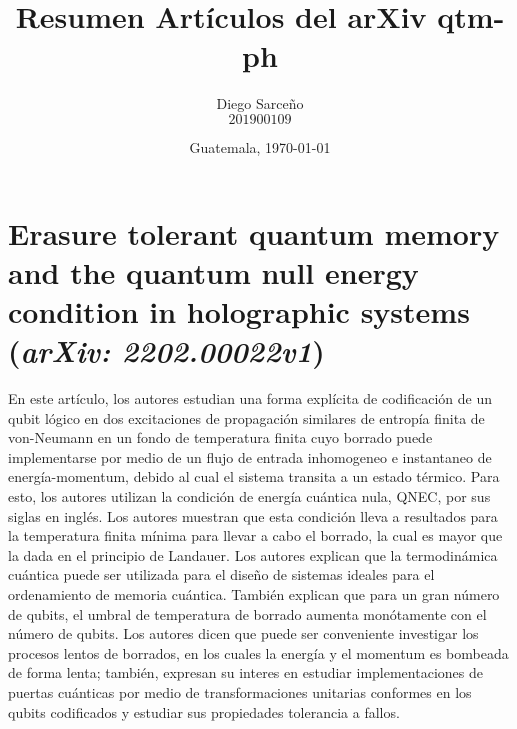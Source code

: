 





\title{\sc Resumen Artículos del arXiv qtm-ph}%
\author{Diego Sarceño \\ $201900109$}
\date{Guatemala, \today}

  
\maketitle





\section{Erasure tolerant quantum memory and the quantum null energy condition in holographic systems (\textit{arXiv: 2202.00022v1})}
\justify
En este artículo, los autores estudian una forma explícita de codificación de un qubit lógico en dos excitaciones de propagación similares de entropía finita de von-Neumann en un fondo de temperatura finita cuyo borrado puede implementarse por medio de un flujo de entrada inhomogeneo e instantaneo de energía-momentum, debido al cual el sistema transita a un estado térmico. Para esto, los autores utilizan la condición de energía cuántica nula, QNEC, por sus siglas en inglés. Los autores muestran que esta condición lleva a resultados para la temperatura finita mínima para llevar a cabo el borrado, la cual es mayor que la dada en el principio de Landauer. Los autores explican que la termodinámica cuántica puede ser utilizada para el diseño de sistemas ideales para el ordenamiento de memoria cuántica. También explican que para un gran número de qubits, el umbral de temperatura de borrado aumenta monótamente con el número de qubits. Los autores dicen que puede ser conveniente investigar los procesos lentos de borrados, en los cuales la energía y el momentum es bombeada de forma lenta; también, expresan su interes en estudiar implementaciones de puertas cuánticas por medio de transformaciones unitarias conformes en los qubits codificados y estudiar sus propiedades tolerancia a fallos.
